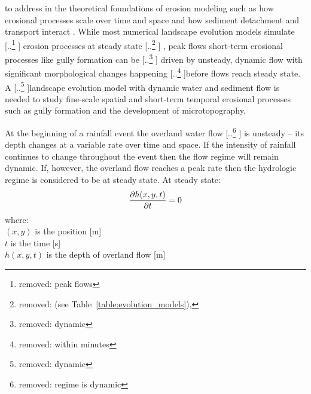 \documentclass[gmd, manuscript]{copernicus}
\providecommand{\DIFadd}[1]{{\protect\color{blue} \sf #1}} %
\providecommand{\DIFdel}[1]{{\protect\color{red} [..\footnote{removed: #1} ]}} %
\providecommand{\DIFaddbegin}{} %
\providecommand{\DIFaddend}{} %
\providecommand{\DIFdelbegin}{} %
\providecommand{\DIFdelend}{} %
\begin{document}
to address in the theoretical foundations of erosion modeling 
such as how erosional processes scale over time and space 
and how sediment detachment and transport interact \citep{Mitasova2013}. 
While most numerical landscape evolution models 
simulate \DIFdelbegin \DIFdel{peak flows }\DIFdelend \DIFaddbegin \DIFadd{erosion processes }\DIFaddend at steady state\DIFdelbegin \DIFdel{(see Table~\ref{table:evolution_models}), }\DIFdelend \DIFaddbegin \DIFadd{, peak flows
}\DIFaddend short-term erosional processes like gully formation can be \DIFdelbegin \DIFdel{dynamic
}\DIFdelend \DIFaddbegin \DIFadd{driven by unsteady, dynamic flow
}\DIFaddend with significant morphological changes happening \DIFdelbegin \DIFdel{within minutes
}\DIFdelend before flows reach steady state. 
A \DIFdelbegin \DIFdel{dynamic }\DIFdelend landscape evolution model \DIFaddbegin \DIFadd{with dynamic water and sediment flow
}\DIFaddend is needed to study fine-scale spatial and short-term temporal erosional processes
such as gully formation and the development of microtopography. 

At the beginning of a rainfall event 
the overland water flow \DIFdelbegin \DIFdel{regime is dynamic }\DIFdelend \DIFaddbegin \DIFadd{is unsteady }\DIFaddend -- 
its depth changes at a variable rate over time and space. 
If the intensity of rainfall continues to change throughout the event
then the flow regime will remain dynamic. 
If, however, the overland flow reaches a peak rate
then the hydrologic regime is considered to be at steady state.
At steady state:
\begin{equation}
\label{eq:steady_state}
{\partial h(x,y,t) \over \partial t} = 0
\end{equation}
%
{\small
\noindent
where: \\
\noindent
\hspace*{0.5em} $(x,y)$ is the position [\unit{m}]\\
\hspace*{0.5em} $t$ is the time [\unit{s}]\\
\hspace*{0.5em} $h(x,y,t)$ is the depth of overland flow [\unit{m}]\\
}
\end{document}
